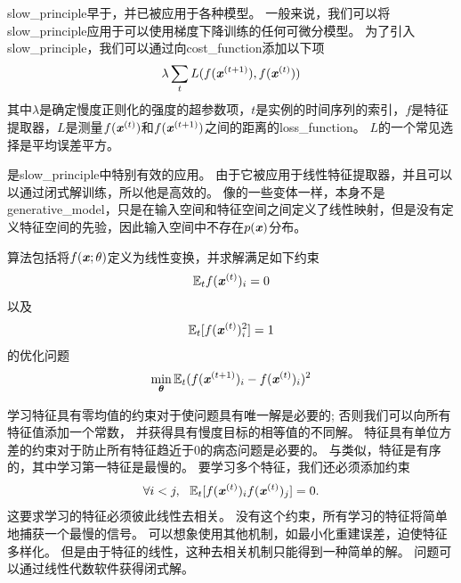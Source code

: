 \gls{slow_principle}早于，并已被应用于各种模型\citep{Hinton89b,Foldiak89,MobahiCollobertWestonICML2009,Bergstra+Bengio-2009}。
一般来说，我们可以将\gls{slow_principle}应用于可以使用梯度下降训练的任何可微分模型。 
为了引入\gls{slow_principle}，我们可以通过向\gls{cost_function}添加以下项
\begin{align}
\label{eqn:137}
\lambda \sum_t 
L(f(\boldsymbol{\mathit{x}}^{(t+1)}),f(\boldsymbol{\mathit{x}}^{(t)}))
\end{align}
其中$\lambda$是确定慢度正则化的强度的超参数项，$t$是实例的时间序列的索引，$f$是特征提取器，$L$是测量$f(\boldsymbol{\mathit{x}}^{(t)})$和$f(\boldsymbol{\mathit{x}}^{(t+1)})$之间的距离的\gls{loss_function}。
$L$的一个常见选择是平均误差平方。


是\gls{slow_principle}中特别有效的应用。
由于它被应用于线性特征提取器，并且可以以通过闭式解训练，所以他是高效的。
像的一些变体一样，本身不是\gls{generative_model}，只是在输入空间和特征空间之间定义了线性映射，但是没有定义特征空间的先验，因此输入空间中不存在$p(\boldsymbol{\mathit{x}})$分布。


算法\citep{WisSej2002}包括将$f(\boldsymbol{\mathit{x}};\theta)$定义为线性变换，并求解满足如下约束
\begin{align}
\label{eqn:139}
\mathbb{E}_t  f(\boldsymbol{\mathit{x}}^{(t)})_i = 0 
\end{align}
以及
\begin{align}
\label{eqn:1310}
\mathbb{E}_t [ f(\boldsymbol{\mathit{x}}^{(t)})_i^2 ] =1 
\end{align}
的优化问题
\begin{align}
\label{eqn:138}
\min_{\boldsymbol{\theta}} \mathbb{E}_t  (f(\boldsymbol{\mathit{x}}^{(t+1)})_i - f(\boldsymbol{\mathit{x}}^{(t)})_i  )^2
\end{align}


学习特征具有零均值的约束对于使问题具有唯一解是必要的; 否则我们可以向所有特征值添加一个常数，
并获得具有慢度目标的相等值的不同解。
特征具有单位方差的约束对于防止所有特征趋近于0的病态问题是必要的。
与类似，特征是有序的，其中学习第一特征是最慢的。
要学习多个特征，我们还必须添加约束
\begin{align}
\label{eqn:1311}
\forall i<j,\ \  \mathbb{E}_t [f(\boldsymbol{\mathit{x}}^{(t)})_i  f(\boldsymbol{\mathit{x}}^{(t)})_j] = 0.
\end{align}
这要求学习的特征必须彼此线性去相关。 
没有这个约束，所有学习的特征将简单地捕获一个最慢的信号。
可以想象使用其他机制，如最小化重建误差，迫使特征多样化。
但是由于特征的线性，这种去相关机制只能得到一种简单的解。 
问题可以通过线性代数软件获得闭式解。



